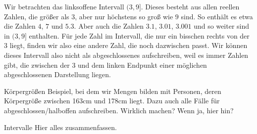 \documentclass[../../main.tex]{subfiles}
\begin{document}
	\begin{example}{}
		Wir betrachten das linksoffene Intervall $(3,9]$. Dieses besteht aus allen reellen Zahlen, die größer als $3$, aber nur höchstens so groß wie $9$ sind. So enthält es etwa die Zahlen $4$, $7$ und $5.3$. Aber auch die Zahlen $3.1$, $3.01$, $3.001$ und so weiter sind in $(3,9]$ enthalten. Für jede Zahl im Intervall, die nur ein bisschen rechts von der $3$ liegt, finden wir also eine andere Zahl, die noch dazwischen passt. Wir können dieses Intervall also nicht als abgeschlossenes aufschreiben, weil es immer Zahlen gibt, die zwischen der $3$ und dem linken Endpunkt einer möglichen abgeschlossenen Darstellung liegen.
	\end{example}
	
	\begin{example}{Körpergrößen}
		Beispiel, bei dem wir Mengen bilden mit Personen, deren Körpergröße zwischen 163cm und 178cm liegt. Dazu auch alle Fälle für abgeschlossen/halboffen aufschreiben. Wirklich machen? Wenn ja, hier hin?
	\end{example}

	\begin{nutshell}{Intervalle}
		Hier alles zusammenfassen.
	\end{nutshell}
\end{document}
